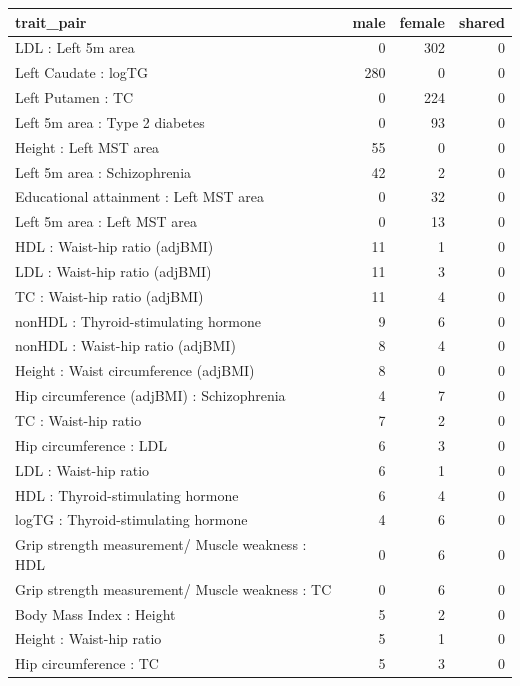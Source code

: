 \begin{table}[ht]
\centering
\begin{tabular}{lrrr}
  \hline
trait\_pair & male & female & shared \\ 
  \hline
LDL : Left 5m area &   0 & 302 &   0 \\ 
  Left Caudate : logTG & 280 &   0 &   0 \\ 
  Left Putamen : TC &   0 & 224 &   0 \\ 
  Left 5m area : Type 2 diabetes &   0 &  93 &   0 \\ 
  Height  : Left MST area &  55 &   0 &   0 \\ 
  Left 5m area : Schizophrenia &  42 &   2 &   0 \\ 
  Educational attainment : Left MST area &   0 &  32 &   0 \\ 
  Left 5m area : Left MST area &   0 &  13 &   0 \\ 
  HDL : Waist-hip ratio (adjBMI) &  11 &   1 &   0 \\ 
  LDL : Waist-hip ratio (adjBMI) &  11 &   3 &   0 \\ 
  TC : Waist-hip ratio (adjBMI) &  11 &   4 &   0 \\ 
  nonHDL : Thyroid-stimulating hormone  &   9 &   6 &   0 \\ 
  nonHDL : Waist-hip ratio (adjBMI) &   8 &   4 &   0 \\ 
  Height  : Waist circumference (adjBMI) &   8 &   0 &   0 \\ 
  Hip circumference (adjBMI) : Schizophrenia &   4 &   7 &   0 \\ 
  TC : Waist-hip ratio  &   7 &   2 &   0 \\ 
  Hip circumference  : LDL &   6 &   3 &   0 \\ 
  LDL : Waist-hip ratio  &   6 &   1 &   0 \\ 
  HDL : Thyroid-stimulating hormone  &   6 &   4 &   0 \\ 
  logTG : Thyroid-stimulating hormone  &   4 &   6 &   0 \\ 
  Grip strength measurement/ Muscle weakness : HDL &   0 &   6 &   0 \\ 
  Grip strength measurement/ Muscle weakness : TC &   0 &   6 &   0 \\ 
  Body Mass Index  : Height  &   5 &   2 &   0 \\ 
  Height  : Waist-hip ratio  &   5 &   1 &   0 \\ 
  Hip circumference  : TC &   5 &   3 &   0 \\ 

\end{tabular}
\end{table}
